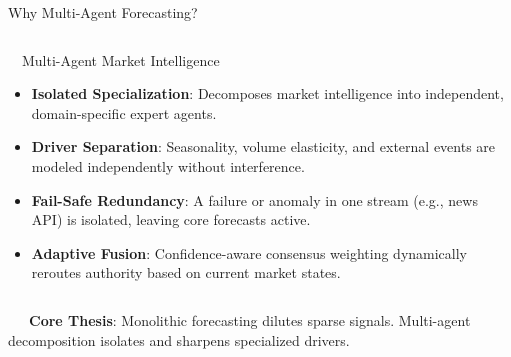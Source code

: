 \documentclass{beamer}
\begin{document}
\begin{frame}{Why Multi-Agent Forecasting?}
\begin{columns}[T]
    \begin{column}{0.48\textwidth}
        \begin{successcard}[height=5.2cm]{~~Multi-Agent Market Intelligence}
            \fontsize{7pt}{8.5pt}\selectfont
            \begin{itemize}\setlength\itemsep{4pt}\setlength\parskip{0pt}
                \item \textbf{Isolated Specialization}: Decomposes market intelligence into independent, domain-specific expert agents.
                \item \textbf{Driver Separation}: Seasonality, volume elasticity, and external events are modeled independently without interference.
                \item \textbf{Fail-Safe Redundancy}: A failure or anomaly in one stream (e.g., news API) is isolated, leaving core forecasts active.
                \item \textbf{Adaptive Fusion}: Confidence-aware consensus weighting dynamically reroutes authority based on current market states.
            \end{itemize}
        \end{successcard}
    \end{column}
\end{columns}

\vspace{0.15cm}
\begin{tcolorbox}[enhanced, colback=primaryblue!4, colframe=primaryblue!30, boxrule=0.35pt,
  arc=3.5pt, width=0.98\textwidth, left=4pt, right=4pt, top=2.5pt, bottom=2.5pt, boxsep=0pt,
  halign=center, shadow={0.5pt}{-0.5pt}{0pt}{black!8}]
    \fontsize{5.5pt}{6.5pt}\selectfont
    \textcolor{primaryDark}{~~~\textbf{Core Thesis}: Monolithic forecasting dilutes sparse signals. Multi-agent decomposition isolates and sharpens specialized drivers.}
\end{tcolorbox}
\end{frame}
\end{document}
